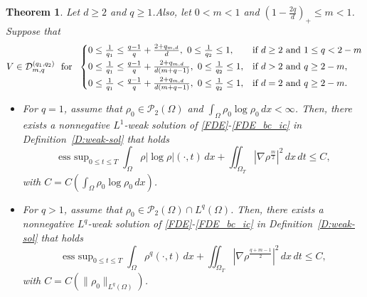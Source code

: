 \documentclass{amsart}
\newtheorem{theorem}[defn]{Theorem}
\numberwithin{equation}{section}
\newcommand{\abs}[1]{\left| #1 \right|}
\DeclareMathOperator*{\esssup}{ess \ sup}
\begin{document}
\begin{theorem}\label{T:weakSol:divfree}
Let $d\geq 2$ and $q\geq 1$.Also, let $0<m<1$ and $ (1-\frac{2q}{d})_{+} \leq m < 1$. Suppose that 
\begin{equation}\label{T:weakSol:divfree:Vq}
  V\in \mathcal{D}_{m,q}^{(q_1, q_2)} \ \text{ for } \
\begin{cases}
0 \leq \frac{1}{q_1} \leq \frac{q-1}{q} + \frac{2+q_{m,d}}{d}, \ 0 \leq \frac{1}{q_2} \leq 1, &\text{if }  d\geq 2 \text{ and } 1 \leq q < 2-m \vspace{1mm}\\
	0 \leq \frac{1}{q_1} \leq \frac{q-1}{q} + \frac{2+q_{m,d}}{d(m+q-1)}, \ 0 \leq \frac{1}{q_2} \leq 1, &\text{if } d>2 \text{ and } q\geq 2-m ,  \vspace{1 mm} \\
	 0 \leq \frac{1}{q_1} < \frac{q-1}{q} + \frac{2+q_{m,d}}{d(m+q-1)}, \ 0 \leq \frac{1}{q_2} \leq 1, &\text{if }  d=2 \text{ and } q \geq 2-m.
\end{cases}
 \end{equation}
\begin{itemize}
\item[(i)] For $q=1$, assume that $\rho_0 \in  \mathcal{P}_2(\Omega)$ and $\int_{\Omega} \rho_0 \log \rho_0 \,dx < \infty$.
Then, there exists a nonnegative $L^1$-weak solution of \eqref{FDE}-\eqref{FDE_bc_ic} in Definition~\ref{D:weak-sol}
that holds 
 \begin{equation}\label{T:weakSol:E_1}
 \esssup_{0\leq t \leq T} \int_{\Omega} \rho \abs{\log \rho  }(\cdot, t) \,dx
 + \iint_{\Omega_T} \abs{\nabla \rho^{\frac{m}{2}}}^2 \,dx\,dt
\leq C,
\end{equation}
with $C = C ( \int_{\Omega} \rho_0 \log \rho_0 \,dx )$.

\item[(ii)] For $q>1$, assume that $\rho_0 \in  \mathcal{P}_2(\Omega) \cap L^{q}(\Omega)$.
Then, there exists a nonnegative $L^q$-weak solution of \eqref{FDE}-\eqref{FDE_bc_ic} in Definition~\ref{D:weak-sol} that holds
 \begin{equation}\label{T:weakSol:E_q}
 \esssup_{0\leq t \leq T} \int_{\Omega} \rho^q(\cdot, t) \,dx
 + \iint_{\Omega_T} \abs{\nabla \rho^{\frac{q+m-1}{2}}}^2 \,dx\,dt
\leq C,
\end{equation}
 with $C = C (\|\rho_{0}\|_{L^{q} (\Omega)} )$.
 

\end{itemize}
\end{theorem}
\end{document}
